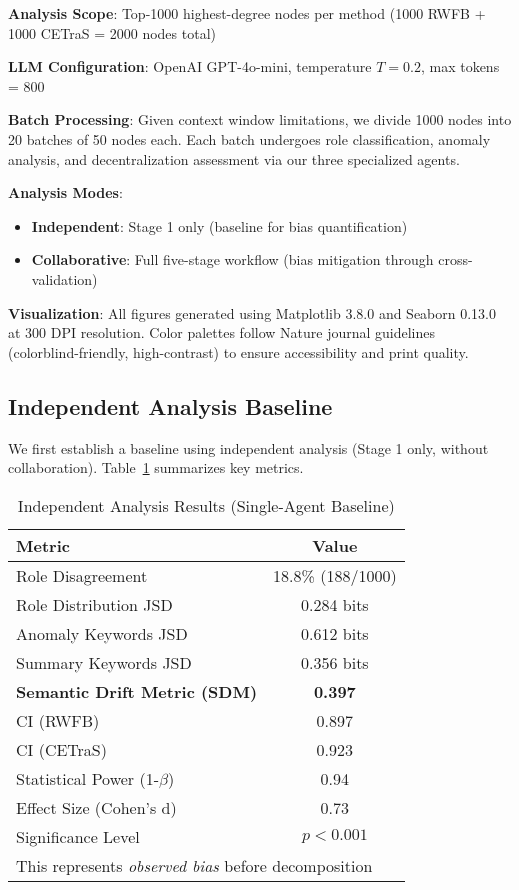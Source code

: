 \documentclass[conference]{IEEEtran}
\begin{document}
\textbf{Analysis Scope}: Top-1000 highest-degree nodes per method (1000 RWFB + 1000 CETraS = 2000 nodes total)

\textbf{LLM Configuration}: OpenAI GPT-4o-mini, temperature $T=0.2$, max tokens = 800

\textbf{Batch Processing}: Given context window limitations, we divide 1000 nodes into 20 batches of 50 nodes each. Each batch undergoes role classification, anomaly analysis, and decentralization assessment via our three specialized agents.

\textbf{Analysis Modes}:
\begin{itemize}
    \item \textbf{Independent}: Stage 1 only (baseline for bias quantification)
    \item \textbf{Collaborative}: Full five-stage workflow (bias mitigation through cross-validation)
\end{itemize}

\textbf{Visualization}: All figures generated using Matplotlib 3.8.0 and Seaborn 0.13.0 at 300 DPI resolution. Color palettes follow Nature journal guidelines~\cite{nature2023style} (colorblind-friendly, high-contrast) to ensure accessibility and print quality.

\subsection{Independent Analysis Baseline}

We first establish a baseline using independent analysis (Stage 1 only, without collaboration). Table~\ref{tab:independent-results} summarizes key metrics.

\begin{table}[htbp]
\centering
\caption{Independent Analysis Results (Single-Agent Baseline)}
\label{tab:independent-results}
\small
\begin{tabular}{l c}
\toprule
\textbf{Metric} & \textbf{Value} \\
\midrule
Role Disagreement & 18.8\% (188/1000) \\
Role Distribution JSD & 0.284 bits \\
Anomaly Keywords JSD & 0.612 bits \\
Summary Keywords JSD & 0.356 bits \\
\textbf{Semantic Drift Metric (SDM)} & \textbf{0.397} \\
\midrule
CI (RWFB) & 0.897 \\
CI (CETraS) & 0.923 \\
\midrule
Statistical Power (1-$\beta$) & 0.94 \\
Effect Size (Cohen's d) & 0.73 \\
Significance Level & $p < 0.001$ \\
\bottomrule
\multicolumn{2}{l}{\footnotesize This represents \textit{observed bias} before decomposition}
\end{tabular}
\end{table}
\end{document}
